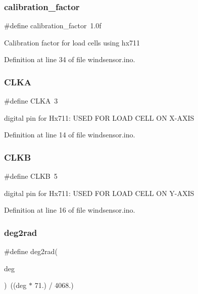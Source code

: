 \subsubsection{\texorpdfstring{calibration\+\_\+factor}{calibration\_factor}}
{\footnotesize\ttfamily \#define calibration\+\_\+factor~1.\+0f}

Calibration factor for load cells using hx711 

Definition at line 34 of file windsensor.\+ino.

\mbox{\label{windsensor_8ino_a6a5dcd886a8a52cab810eb8a461c96f5}} 
\subsubsection{\texorpdfstring{C\+L\+KA}{CLKA}}
{\footnotesize\ttfamily \#define C\+L\+KA~3}

digital pin for Hx711\+: U\+S\+ED F\+OR L\+O\+AD C\+E\+LL ON X-\/\+A\+X\+IS 

Definition at line 14 of file windsensor.\+ino.

\mbox{\label{windsensor_8ino_aeeac7c3e17c81d104245d857c7bd184f}} 
\subsubsection{\texorpdfstring{C\+L\+KB}{CLKB}}
{\footnotesize\ttfamily \#define C\+L\+KB~5}

digital pin for Hx711\+: U\+S\+ED F\+OR L\+O\+AD C\+E\+LL ON Y-\/\+A\+X\+IS 

Definition at line 16 of file windsensor.\+ino.

\mbox{\label{windsensor_8ino_a894738198a00b6a55e87799c0f8712bb}} 
\subsubsection{\texorpdfstring{deg2rad}{deg2rad}}
{\footnotesize\ttfamily \#define deg2rad(\begin{DoxyParamCaption}\item[{}]{deg }\end{DoxyParamCaption})~((deg $\ast$ 71.) / 4068.)}



